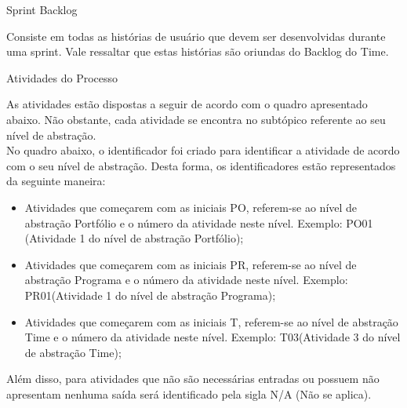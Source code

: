 {
	\large{Sprint Backlog\\}

	\tab Consiste em todas as histórias de usuário que devem ser desenvolvidas durante uma sprint. Vale ressaltar que estas histórias são oriundas do Backlog do Time. \\
}

{

	\large{Atividades do Processo \\}

	\tab As atividades  estão dispostas a seguir de acordo com o quadro apresentado abaixo. Não obstante, cada atividade se encontra no subtópico referente ao seu nível de abstração. \\
	\tab No quadro abaixo, o identificador foi criado para identificar a atividade de acordo com o seu nível de abstração. Desta forma, os identificadores estão representados da seguinte maneira: 

	\begin{itemize}
		\item Atividades que começarem com as iniciais PO, referem-se ao nível de abstração Portfólio e o número da atividade neste nível. Exemplo: PO01 (Atividade 1 do nível de abstração Portfólio);
		\item Atividades que começarem com as iniciais PR, referem-se ao nível de abstração Programa e o número da atividade neste nível. Exemplo: PR01(Atividade 1 do nível de abstração Programa);
		\item Atividades que começarem com as iniciais T, referem-se ao nível de abstração Time e o número da atividade neste nível. Exemplo: T03(Atividade 3 do nível de abstração Time); 
	\end{itemize}

	\tab Além disso, para atividades que não são necessárias entradas ou possuem não apresentam nenhuma saída será identificado pela sigla N/A (Não se aplica).\\


}
